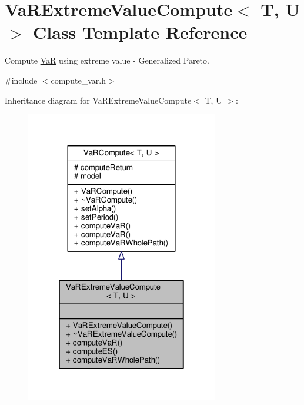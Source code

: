 \hypertarget{classVaRExtremeValueCompute}{}\section{Va\+R\+Extreme\+Value\+Compute$<$ T, U $>$ Class Template Reference}
\label{classVaRExtremeValueCompute}


Compute \hyperlink{classVaR}{VaR} using extreme value -\/ Generalized Pareto.  




{\ttfamily \#include $<$compute\+\_\+var.\+h$>$}



Inheritance diagram for Va\+R\+Extreme\+Value\+Compute$<$ T, U $>$\+:
\nopagebreak
\begin{figure}[H]
\begin{center}
\leavevmode
\includegraphics[width=238pt]{classVaRExtremeValueCompute__inherit__graph}
\end{center}
\end{figure}



